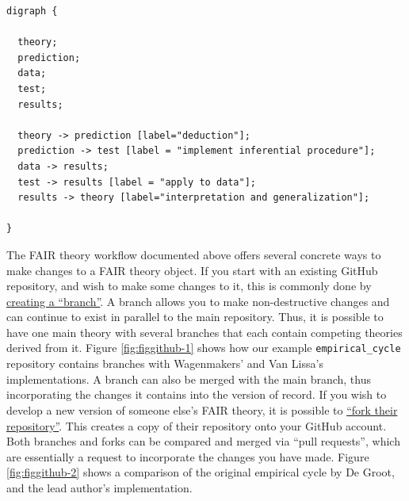 \documentclass[
  man, noextraspace,floatsintext]{apa6}
\begin{document}
\begin{verbatim}
digraph {

  theory;
  prediction;
  data;
  test;
  results;
  
  theory -> prediction [label="deduction"];
  prediction -> test [label = "implement inferential procedure"];
  data -> results;
  test -> results [label = "apply to data"];
  results -> theory [label="interpretation and generalization"];

}
\end{verbatim}

The FAIR theory workflow documented above offers several concrete ways to make changes to a FAIR theory object.
If you start with an existing GitHub repository, and wish to make some changes to it,
this is commonly done by \href{https://docs.github.com/en/pull-requests/collaborating-with-pull-requests/proposing-changes-to-your-work-with-pull-requests/creating-and-deleting-branches-within-your-repository}{creating a ``branch''}.
A branch allows you to make non-destructive changes and can continue to exist in parallel to the main repository.
Thus, it is possible to have one main theory with several branches that each contain competing theories derived from it.
Figure \ref{fig:figgithub-1} shows how our example \texttt{empirical\_cycle} repository contains branches with Wagenmakers' and Van Lissa's implementations.
A branch can also be merged with the main branch, thus incorporating the changes it contains into the version of record.
If you wish to develop a new version of someone else's FAIR theory,
it is possible to \href{https://docs.github.com/en/pull-requests/collaborating-with-pull-requests/working-with-forks/fork-a-repo}{``fork their repository''}.
This creates a copy of their repository onto your GitHub account.
Both branches and forks can be compared and merged via ``pull requests'', which are essentially a request to incorporate the changes you have made.
Figure \ref{fig:figgithub-2} shows a comparison of the original empirical cycle by De Groot, and the lead author's implementation.
\end{document}
